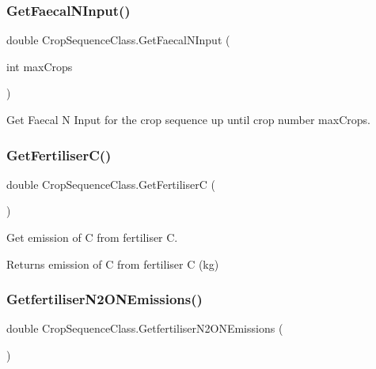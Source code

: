 \subsubsection{\texorpdfstring{GetFaecalNInput()}{GetFaecalNInput()}\hspace{0.1cm}{\footnotesize\ttfamily [2/2]}}
{\footnotesize\ttfamily double Crop\+Sequence\+Class.\+Get\+Faecal\+N\+Input (\begin{DoxyParamCaption}\item[{int}]{max\+Crops }\end{DoxyParamCaption})\hspace{0.3cm}{\ttfamily [inline]}}



Get Faecal N Input for the crop sequence up until crop number max\+Crops. 

\mbox{\label{class_crop_sequence_class_a2e02c66c8af9fcd82010a21360fb1553}} 
\subsubsection{\texorpdfstring{GetFertiliserC()}{GetFertiliserC()}}
{\footnotesize\ttfamily double Crop\+Sequence\+Class.\+Get\+FertiliserC (\begin{DoxyParamCaption}{ }\end{DoxyParamCaption})\hspace{0.3cm}{\ttfamily [inline]}}



Get emission of C from fertiliser C. 

\begin{DoxyReturn}{Returns}
emission of C from fertiliser C (kg) 
\end{DoxyReturn}
\mbox{\label{class_crop_sequence_class_af23bd7ffab590aadee2496ef4b3ecce0}} 
\subsubsection{\texorpdfstring{GetfertiliserN2ONEmissions()}{GetfertiliserN2ONEmissions()}\hspace{0.1cm}{\footnotesize\ttfamily [1/2]}}
{\footnotesize\ttfamily double Crop\+Sequence\+Class.\+Getfertiliser\+N2\+O\+N\+Emissions (\begin{DoxyParamCaption}{ }\end{DoxyParamCaption})\hspace{0.3cm}{\ttfamily [inline]}}



